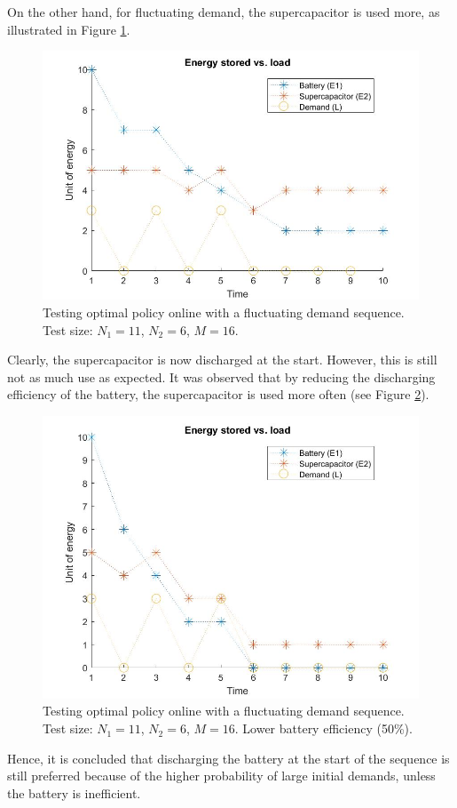\documentclass[conference]{IEEEtran}
\begin{document}
On the other hand, for fluctuating demand, the supercapacitor is used more, as illustrated in Figure \ref{fig:FluctuatingDemand}.
\begin{figure}[htbp]
\centerline{\includegraphics[scale=0.25]{EnergyStoredvsFluctuatingLoad(E1=10,E2=5).jpg}}
\caption{Testing optimal policy online with a fluctuating demand sequence. Test size: $N_{1}=11$, $N_{2}=6$, $M=16$.}
\label{fig:FluctuatingDemand}
\end{figure} Clearly, the supercapacitor is now discharged at the start. However, this is still not as much use as expected. It was observed that by reducing the discharging efficiency of the battery, the supercapacitor is used more often (see Figure \ref{fig:FluctuatingDemand_LowBattEff}).
\begin{figure}[tbp]
\centerline{\includegraphics[scale=0.25]{EnergyStoredvsFluctuatingLoad_LowBattEff(E1=10,E2=5).jpg}}
\caption{Testing optimal policy online with a fluctuating demand sequence. Test size: $N_{1}=11$, $N_{2}=6$, $M=16$. Lower battery efficiency (50\%).}
\label{fig:FluctuatingDemand_LowBattEff}
\end{figure} Hence, it is concluded that discharging the battery at the start of the sequence is still preferred because of the higher probability of large initial demands, unless the battery is inefficient.
\end{document}
